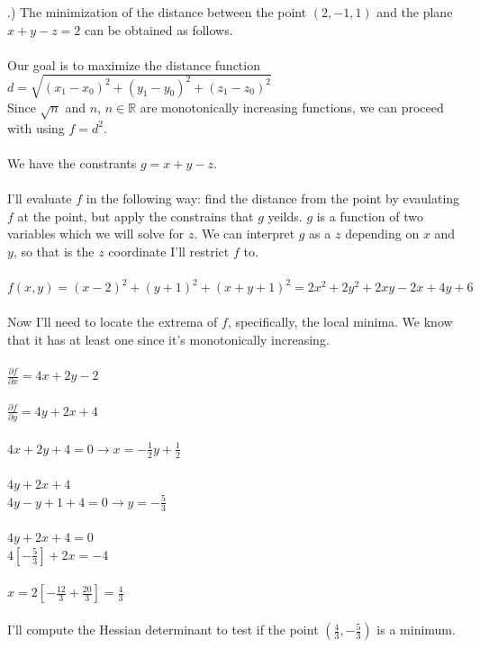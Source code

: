 \documentclass[12pt]{article}
\begin{document}
.) The minimization of the distance between the point $(2, -1, 1)$ and the plane $x+y-z = 2$ can be obtained as follows.\\\\
\noindent Our goal is to maximize the distance function $d = \sqrt{(x_{1} - x_{0})^{2} + (y_{1} - y_{0})^{2} + (z_{1} - z_{0})^{2}}$\\
\noindent Since $\sqrt{n}$ and $n$, $n \in \mathbb{R}$ are monotonically increasing functions, we can proceed with using $f = d^{2}$.\\\\
\noindent We have the constrants $g = x+y-z$.\\\\
\noindent I'll evaluate $f$ in the following way: find the distance from the point by evaulating $f$ at the point, but apply the constrains 
that $g$ yeilds. $g$ is a function of two variables which we will solve for $z$. We can interpret $g$ as a $z$ depending on $x$ and $y$, so 
that is the $z$ coordinate I'll restrict $f$ to.\\\\
\noindent $f(x,y) = (x-2)^{2} + (y+1)^{2} + (x + y +1)^{2} = 2x^{2}+2y^{2}+2xy-2x+4y+6$\\\\
\noindent Now I'll need to locate the extrema of $f$, specifically, the local minima. We know that it has at least one since it's monotonically increasing. \\\\
\noindent $\frac{\partial f}{\partial x} = 4x+2y-2$\\\\
\noindent $\frac{\partial f}{\partial y} = 4y+2x + 4$\\\\
\noindent $4x+2y+4 = 0 \rightarrow x = -\frac{1}{2}y+\frac{1}{2}$\\\\
\noindent $4y+2x + 4$\\
\noindent $4y -y + 1 +4 = 0 \rightarrow y = -\frac{5}{3}$\\\\
\noindent $4y+2x+4 = 0$\\
\noindent $4[-\frac{5}{3}] + 2x = -4$\\\\
\noindent $x = 2[-\frac{12}{3} + \frac{20}{3}] = \frac{4}{3}$\\\\
\noindent I'll compute the Hessian determinant to test if the point $(\frac{4}{3}, -\frac{5}{3})$ is a minimum.\\
\end{document}
